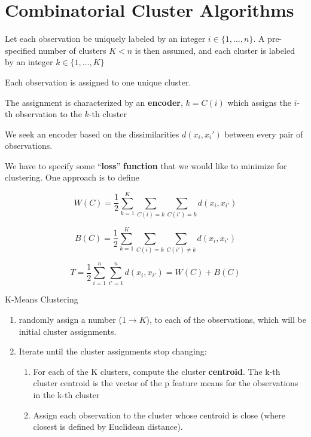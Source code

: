 \documentclass[
]{book}
\begin{document}
\hypertarget{combinatorial-cluster-algorithms}{%
\section{Combinatorial Cluster Algorithms}\label{combinatorial-cluster-algorithms}}

Let each observation be uniquely labeled by an integer \(i \in \{1, \dots, n\}\). A pre-specified number of clusters \(K<n\) is then assumed, and each cluster is labeled by an integer \(k \in \{ 1, \dots, K \}\)

Each observation is assigned to one unique cluster.

The assignment is characterized by an \textbf{encoder}, \(k = C(i)\) which assigns the \(i\)-th observation to the \(k\)-th cluster

We seek an encoder based on the dissimilarities \(d(x_i, x_i')\) between every pair of observations.

We have to specify some ``\textbf{loss}'' \textbf{function} that we would like to minimize for clustering. One approach is to define

\[
W(C) = \frac{1}{2} \sum_{k=1}^K \sum_{C(i)= k} \sum_{C(i') = k} d(x_i, x_{i'})
\]

\[
B(C) = \frac{1}{2} \sum_{k=1}^K \sum_{C(i) = k} \sum_{C(i') \neq k} d(x_i, x_{i'})
\]

\[
T = \frac{1}{2} \sum_{i=1}^n \sum_{i'=1}^n d(x_i, x_{i'}) = W(C) + B(C)
\]

K-Means Clustering

\begin{enumerate}
\def\labelenumi{\arabic{enumi}.}
\item
  randomly assign a number (\(1 \to K\)), to each of the observations, which will be initial cluster assignments.
\item
  Iterate until the cluster assignments stop changing:

  \begin{enumerate}
  \def\labelenumii{\arabic{enumii}.}
  \item
    For each of the K clusters, compute the cluster \textbf{centroid}. The k-th cluster centroid is the vector of the p feature means for the observations in the k-th cluster
  \item
    Assign each observation to the cluster whose centroid is close (where closest is defined by Euclidean distance).
  \end{enumerate}
\end{enumerate}
\end{document}
